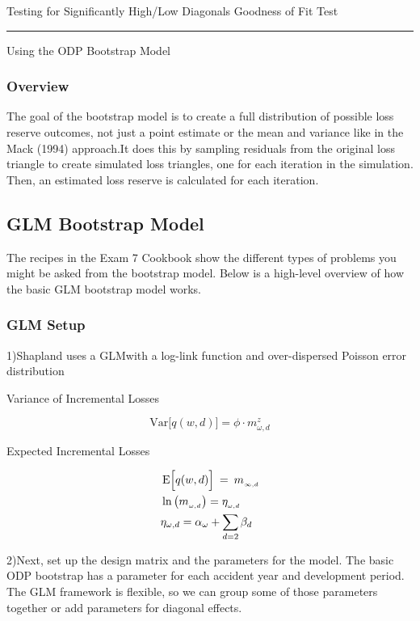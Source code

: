 \documentclass[
]{article}
\begin{document}
Testing for Significantly High/Low Diagonals Goodness of Fit Test

\begin{center}\rule{0.5\linewidth}{0.5pt}\end{center}

Using the ODP Bootstrap Model

\subsubsection{Overview}\label{overview-6}

The goal of the bootstrap model is to create a full distribution of
possible loss reserve outcomes, not just a point estimate or the mean
and variance like in the Mack (1994) approach.It does this by sampling
residuals from the original loss triangle to create simulated loss
triangles, one for each iteration in the simulation. Then, an estimated
loss reserve is calculated for each iteration.

\subsection{GLM Bootstrap Model}\label{glm-bootstrap-model}

The recipes in the Exam 7 Cookbook show the different types of problems
you might be asked from the bootstrap model. Below is a high-level
overview of how the basic GLM bootstrap model works.

\subsubsection{GLM Setup}\label{glm-setup}

1)Shapland uses a GLMwith a log-link function and over-dispersed Poisson
error distribution

Variance of Incremental Losses

\[\mathrm{Var}\Big[q(w,d)\Big]=\phi\cdot m_{\omega,d}^{z}\]

Expected Incremental Losses

\[
\begin{aligned}
&\operatorname{E}\Bigl[q(w,d)\Bigr]\:=\:m_{_{\infty,d}} \\
&\ln\left(m_{_{\omega,d}}\right)=\eta_{_{\omega,d}} \\
&\eta_{\omega,d}=\alpha_{\omega}+\sum_{d=2}\beta_{d}
\end{aligned}
\]

2)Next, set up the design matrix and the parameters for the model. The
basic ODP bootstrap has a parameter for each accident year and
development period. The GLM framework is flexible, so we can group some
of those parameters together or add parameters for diagonal effects.
\end{document}
